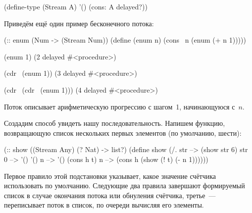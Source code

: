 \begin{Definition}
(define-type (Stream A)
  '()
  (cons: A delayed?))
\end{Definition}

\noindent%
Приведём ещё один пример бесконечного потока:

\begin{Definition}[emph={n}]
(:: enum (Num -> (Stream Num))
 (define (enum n) 
   (cons~ n (enum (+ n 1)))))
\end{Definition}

\REPL
  {(enum 1)}
  {(2 delayed \#<procedure>)}

\REPL
  {(cdr~ (enum 1))}
  {(3 delayed \#<procedure>)}

\REPL
  {(cdr~ (cdr~ (enum 1)))}
  {(4 delayed \#<procedure>)}

Поток  описывает арифметическую прогрессию с шагом~1, начинающуюся с~$n$.

Создадим способ увидеть нашу последовательность. Напишем функцию, возвращающую список нескольких первых элементов (по умолчанию, шести):
\begin{Definition}[emph={str,n,h,t}]
(:: show ((Stream Any) (? Nat) -> list?)
 (define show
   (/. str   --> (show str 6)
       str 0 --> '()
       '() n --> '()
       (cons h t) n --> (cons h (show (! t) (- n 1))))))
\end{Definition}
Первое правило этой подстановки указывает, какое значение счётчика использовать по умолчанию. Следующие два правила завершают формируемый список в случае окончания потока или обнуления счётчика, третье~--- переписывает поток в список, по очереди вычисляя его элементы.

